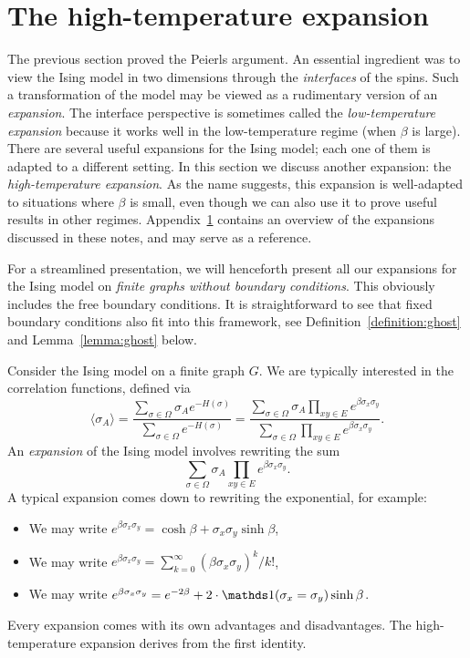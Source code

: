 \section{The high-temperature expansion}

The previous section proved the Peierls argument.
An essential ingredient was to view the Ising model in two dimensions
through the \emph{interfaces} of the spins.
Such a transformation of the model may be viewed as a rudimentary version of
an \emph{expansion}.
The interface perspective is sometimes called the \emph{low-temperature expansion}
because it works well in the low-temperature regime (when $\beta$ is large).
There are several useful expansions for the Ising model;
each one of them is adapted to a different setting.
In this section we discuss another expansion: the \emph{high-temperature expansion}.
As the name suggests, this expansion is well-adapted to situations where $\beta$
is small, even though we can also use it to prove useful results in other regimes.
Appendix~\ref{} contains an overview of the expansions
discussed in these notes, and may serve as a reference.

For a streamlined presentation, we will henceforth present all our expansions
for the Ising model on \emph{finite graphs without boundary conditions}.
This obviously includes the free boundary conditions.
It is straightforward to see that fixed boundary conditions
also fit into this framework, see Definition~\ref{definition:ghost} and Lemma~\ref{lemma:ghost} below.

Consider the Ising model on a finite graph $G$.
We are typically interested in the correlation functions,
defined via
\[
    \langle\sigma_A\rangle
    =
    \frac{\sum_{\sigma\in\Omega}\sigma_A e^{-H(\sigma)}}{\sum_{\sigma\in\Omega}e^{-H(\sigma)}}
    =
    \frac{\sum_{\sigma\in\Omega}\sigma_A \prod_{xy\in E} e^{\beta\sigma_x\sigma_y} }{\sum_{\sigma\in\Omega}\prod_{xy\in E} e^{\beta\sigma_x\sigma_y} }.
\]
An \emph{expansion} of the Ising model involves rewriting the sum
\[
    \sum_{\sigma\in\Omega}\sigma_A \prod_{xy\in E} e^{\beta\sigma_x\sigma_y}.
\]
A typical expansion comes down to rewriting the exponential, for example:
\begin{itemize}
    \item We may write $e^{\beta\sigma_x\sigma_y}=\cosh \beta + \sigma_x\sigma_y \sinh \beta$,
    \item We may write $e^{\beta\sigma_x\sigma_y}=\sum_{k=0}^\infty (\beta\sigma_x\sigma_y)^k/k!$,
    \item We may write $e^{\beta\sigma_x\sigma_y}=e^{-2\beta} + 2\cdot\true{\sigma_x=\sigma_y}\sinh\beta$.
\end{itemize}
Every expansion comes with its own advantages and disadvantages.
The high-temperature expansion derives from the first identity.

